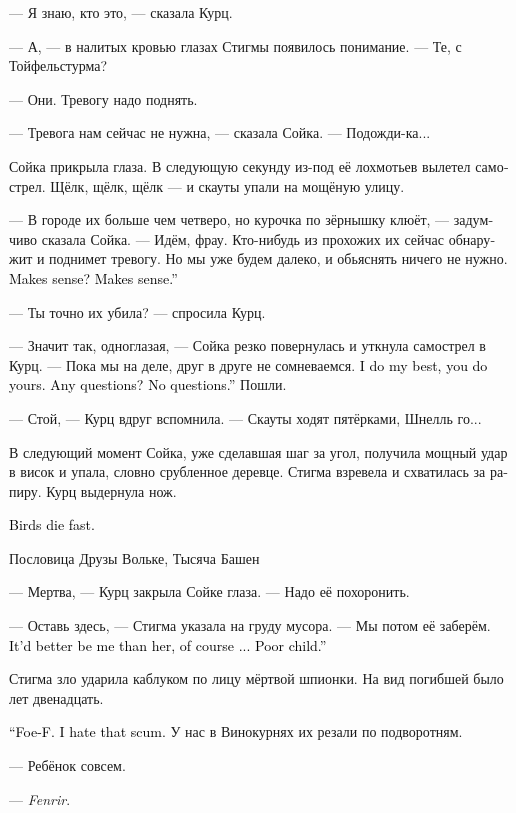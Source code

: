 \documentclass[a4paper,12pt,fleqn]{book}\usepackage{cooltooltips}\usepackage{polyglossia}\setdefaultlanguage[babelshorthands=true]{russian}\setotherlanguage{english}\defaultfontfeatures{Ligatures=TeX,Mapping=tex-text} \usepackage{xcolor}\definecolor{lightgray}{HTML}{bbbbbb}\color{lightgray}\newcommand{\ml}[3]{\textenglish{\textcolor{black}{#3}}}
\newcommand{\textspace}{\vspace{1em}{\centering\Large\bfseries<...>\par}\vspace{1em}}
\begin{document}
--- Я знаю, кто это, --- сказала Курц.

--- А, --- в налитых кровью глазах Стигмы появилось понимание.
--- Те, с Тойфельстурма?

--- Они.
Тревогу надо поднять.

--- Тревога нам сейчас не нужна, --- сказала Сойка.
--- Подожди-ка...

Сойка прикрыла глаза.
В следующую секунду из-под её лохмотьев вылетел самострел.
Щёлк, щёлк, щёлк --- и скауты упали на мощёную улицу.

--- В городе их больше чем четверо, но курочка по зёрнышку клюёт, --- задумчиво сказала Сойка.
--- Идём, фрау.
Кто-нибудь из прохожих их сейчас обнаружит и поднимет тревогу.
Но мы уже будем далеко, и обьяснять ничего не нужно.
\ml{$0$}
{Разумно?}
{Makes sense?}
\ml{$0$}
{Разумно.}
{Makes sense.''}

--- Ты точно их убила? --- спросила Курц.

--- Значит так, одноглазая, --- Сойка резко повернулась и уткнула самострел в Курц.
--- Пока мы на деле, друг в друге не сомневаемся.
\ml{$0$}
{Я делаю всё в лучшем виде, и ты тоже.}
{I do my best, you do yours.}
\ml{$0$}
{Вопросы?}
{Any questions?}
\ml{$0$}
{Вопросов нет.}
{No questions.''}
Пошли.

--- Стой, --- Курц вдруг вспомнила.
--- Скауты ходят пятёрками, Шнелль го...

В следующий момент Сойка, уже сделавшая шаг за угол, получила мощный удар в висок и упала, словно срубленное деревце.
Стигма взревела и схватилась за рапиру.
Курц выдернула нож.

\textspace

\epigraph
{\ml{$0$}
{Птицы умирают быстро.}
{Birds die fast.}}
{Пословица Друзы Вольке, Тысяча Башен}

--- Мертва, --- Курц закрыла Сойке глаза.
--- Надо её похоронить.

--- Оставь здесь, --- Стигма указала на груду мусора.
--- Мы потом её заберём.
\ml{$0$}
{Лучше бы меня завалили, конечно...}
{It'd better be me than her, of course ...}
\ml{$0$}
{Жалко девчонку.}
{Poor child.''}

Стигма зло ударила каблуком по лицу мёртвой шпионки.
На вид погибшей было лет двенадцать.

\ml{$0$}
{--- Фоу-Ф.}
{``Foe-F.}
\ml{$0$}
{Ненавижу этих отбросов.}
{I hate that scum.}
У нас в Винокурнях их резали по подворотням.

--- Ребёнок совсем.

--- \textit{Fenrir}.
\end{document}
